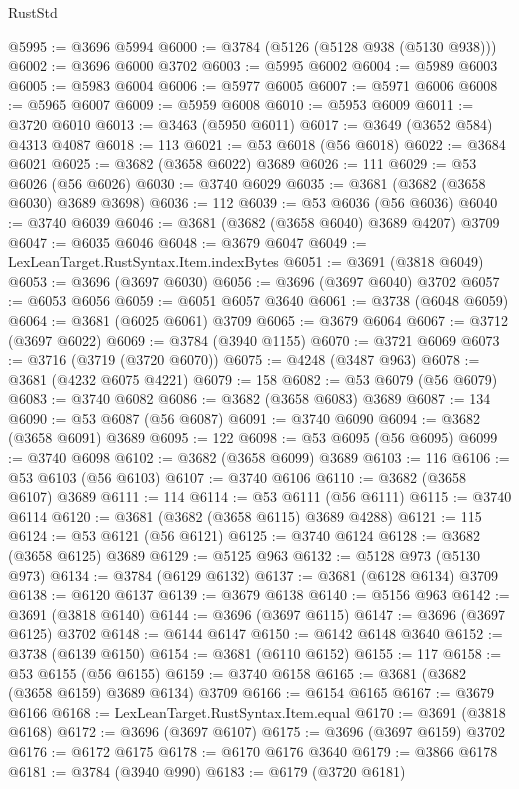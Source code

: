\begin{lexlean}{RustStd}
\begin{coremodule}
@5995 := @3696 @5994
@6000 := @3784 (@5126 (@5128 @938 (@5130 @938)))
@6002 := @3696 @6000 @3702
@6003 := @5995 @6002
@6004 := @5989 @6003
@6005 := @5983 @6004
@6006 := @5977 @6005
@6007 := @5971 @6006
@6008 := @5965 @6007
@6009 := @5959 @6008
@6010 := @5953 @6009
@6011 := @3720 @6010
@6013 := @3463 (@5950 @6011)
@6017 := @3649 (@3652 @584) @4313 @4087
@6018 := 113
@6021 := @53 @6018 (@56 @6018)
@6022 := @3684 @6021
@6025 := @3682 (@3658 @6022) @3689
@6026 := 111
@6029 := @53 @6026 (@56 @6026)
@6030 := @3740 @6029
@6035 := @3681 (@3682 (@3658 @6030) @3689 @3698)
@6036 := 112
@6039 := @53 @6036 (@56 @6036)
@6040 := @3740 @6039
@6046 := @3681 (@3682 (@3658 @6040) @3689 @4207) @3709
@6047 := @6035 @6046
@6048 := @3679 @6047
@6049 := LexLeanTarget.RustSyntax.Item.indexBytes
@6051 := @3691 (@3818 @6049)
@6053 := @3696 (@3697 @6030)
@6056 := @3696 (@3697 @6040) @3702
@6057 := @6053 @6056
@6059 := @6051 @6057 @3640
@6061 := @3738 (@6048 @6059)
@6064 := @3681 (@6025 @6061) @3709
@6065 := @3679 @6064
@6067 := @3712 (@3697 @6022)
@6069 := @3784 (@3940 @1155)
@6070 := @3721 @6069
@6073 := @3716 (@3719 (@3720 @6070))
@6075 := @4248 (@3487 @963)
@6078 := @3681 (@4232 @6075 @4221)
@6079 := 158
@6082 := @53 @6079 (@56 @6079)
@6083 := @3740 @6082
@6086 := @3682 (@3658 @6083) @3689
@6087 := 134
@6090 := @53 @6087 (@56 @6087)
@6091 := @3740 @6090
@6094 := @3682 (@3658 @6091) @3689
@6095 := 122
@6098 := @53 @6095 (@56 @6095)
@6099 := @3740 @6098
@6102 := @3682 (@3658 @6099) @3689
@6103 := 116
@6106 := @53 @6103 (@56 @6103)
@6107 := @3740 @6106
@6110 := @3682 (@3658 @6107) @3689
@6111 := 114
@6114 := @53 @6111 (@56 @6111)
@6115 := @3740 @6114
@6120 := @3681 (@3682 (@3658 @6115) @3689 @4288)
@6121 := 115
@6124 := @53 @6121 (@56 @6121)
@6125 := @3740 @6124
@6128 := @3682 (@3658 @6125) @3689
@6129 := @5125 @963
@6132 := @5128 @973 (@5130 @973)
@6134 := @3784 (@6129 @6132)
@6137 := @3681 (@6128 @6134) @3709
@6138 := @6120 @6137
@6139 := @3679 @6138
@6140 := @5156 @963
@6142 := @3691 (@3818 @6140)
@6144 := @3696 (@3697 @6115)
@6147 := @3696 (@3697 @6125) @3702
@6148 := @6144 @6147
@6150 := @6142 @6148 @3640
@6152 := @3738 (@6139 @6150)
@6154 := @3681 (@6110 @6152)
@6155 := 117
@6158 := @53 @6155 (@56 @6155)
@6159 := @3740 @6158
@6165 := @3681 (@3682 (@3658 @6159) @3689 @6134) @3709
@6166 := @6154 @6165
@6167 := @3679 @6166
@6168 := LexLeanTarget.RustSyntax.Item.equal
@6170 := @3691 (@3818 @6168)
@6172 := @3696 (@3697 @6107)
@6175 := @3696 (@3697 @6159) @3702
@6176 := @6172 @6175
@6178 := @6170 @6176 @3640
@6179 := @3866 @6178
@6181 := @3784 (@3940 @990)
@6183 := @6179 (@3720 @6181)

\end{coremodule}
\end{lexlean}
